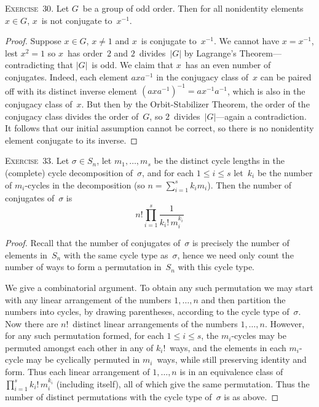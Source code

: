 \documentclass[letterpaper]{article}
\newcommand{\exercise}[1]{\goodbreak\noindent\textsc{Exercise~{#1}.}}
\newcommand{\ord}[1]{|{#1}|}
\begin{document}
\exercise{30}
Let $G$~be a group of odd order. Then for all nonidentity elements $x\in G$, $x$~is not conjugate to~$x^{-1}$.
\begin{proof}
Suppose $x\in G$, $x\ne1$ and $x$~is conjugate to~$x^{-1}$. We cannot have $x=x^{-1}$, lest $x^2=1$ so $x$~has order~$2$ and $2$~divides~$\ord{G}$ by Lagrange's Theorem---contradicting that $\ord{G}$~is odd. We claim that $x$~has an even number of conjugates. Indeed, each element $axa^{-1}$ in the conjugacy class of~$x$ can be paired off with its distinct inverse element $(axa^{-1})^{-1}=ax^{-1}a^{-1}$, which is also in the conjugacy class of~$x$. But then by the Orbit-Stabilizer Theorem, the order of the conjugacy class divides the order of~$G$, so $2$~divides~$\ord{G}$---again a contradiction. It follows that our initial assumption cannot be correct, so there is no nonidentity element conjugate to its inverse.
\end{proof}

\exercise{33}
Let $\sigma\in S_n$, let $m_1,\ldots,m_s$ be the distinct cycle lengths in the (complete) cycle decomposition of~$\sigma$, and for each $1\le i\le s$ let~$k_i$ be the number of $m_i$-cycles in the decomposition (so $n=\sum_{i=1}^sk_im_i$). Then the number of conjugates of~$\sigma$ is
$$n!\prod_{i=1}^s\frac{1}{k_i!\,m_i^{k_i}}$$
\begin{proof}
Recall that the number of conjugates of~$\sigma$ is precisely the number of elements in~$S_n$ with the same cycle type as~$\sigma$, hence we need only count the number of ways to form a permutation in~$S_n$ with this cycle type.

We give a combinatorial argument. To obtain any such permutation we may start with any linear arrangement of the numbers $1,\ldots,n$ and then partition the numbers into cycles, by drawing parentheses, according to the cycle type of~$\sigma$. Now there are $n!$~distinct linear arrangements of the numbers $1,\ldots,n$. However, for any such permutation formed, for each $1\le i\le s$, the $m_i$-cycles may be permuted amongst each other in any of $k_i!$~ways, and the elements in each $m_i$-cycle may be cyclically permuted in $m_i$~ways, while still preserving identity and form. Thus each linear arrangement of $1,\ldots,n$ is in an equivalence class of $\prod_{i=1}^s k_i!\,m_i^{k_i}$ (including itself), all of which give the same permutation. Thus the number of distinct permutations with the cycle type of~$\sigma$ is as above.
\end{proof}
\end{document}
